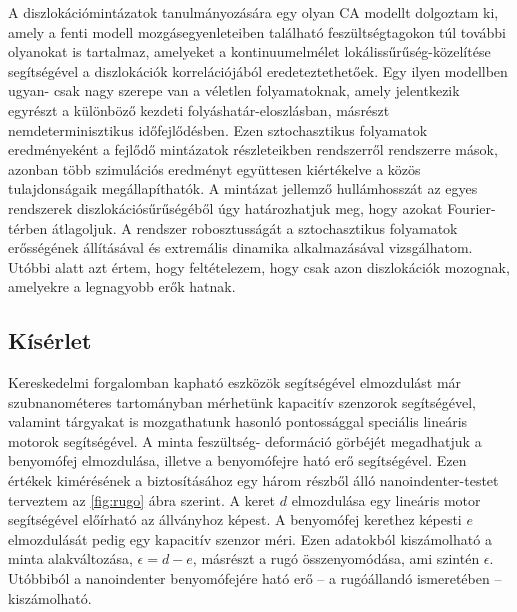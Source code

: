 \documentclass[a5paper,twoside,10pt]{article}
\begin{document}
A diszlokációmintázatok tanulmányozására egy olyan CA modellt dolgoztam ki, amely a fenti modell mozgásegyenleteiben található feszültségtagokon túl további olyanokat is tartalmaz, amelyeket a kontinuumelmélet lokálissűrűség-közelítése segítségével a diszlokációk korrelációjából eredeteztethetőek. Egy ilyen modellben ugyan- csak nagy szerepe van a véletlen folyamatoknak, amely jelentkezik egyrészt a különböző kezdeti folyáshatár-eloszlásban, másrészt nemdeterminisztikus időfejlődésben. Ezen sztochasztikus folyamatok eredményeként a fejlődő mintázatok részleteikben rendszerről rendszerre mások, azonban több szimulációs eredményt együttesen kiértékelve a közös tulajdonságaik megállapíthatók. A mintázat jellemző hullámhosszát az egyes rendszerek diszlokációsűrűségéből úgy határozhatjuk meg, hogy azokat Fourier-térben átlagoljuk. A rendszer robosztusságát a sztochasztikus folyamatok erősségének állításával és extremális dinamika alkalmazásával vizsgálhatom. Utóbbi alatt azt értem, hogy feltételezem, hogy csak azon diszlokációk mozognak, amelyekre a legnagyobb erők hatnak.

\subsection*{Kísérlet}
Kereskedelmi forgalomban kapható eszközök segítségével elmozdulást már szubnanométeres tartományban mérhetünk kapacitív szenzorok segítségével, valamint tárgyakat is mozgathatunk hasonló pontossággal speciális lineáris motorok segítségével. A minta feszültség- deformáció görbéjét megadhatjuk a benyomófej elmozdulása, illetve a benyomófejre ható erő segítségével. Ezen értékek kimérésének a biztosításához egy három részből álló nanoindenter-testet terveztem az \ref{fig:rugo} ábra szerint. A keret $d$ elmozdulása egy lineáris motor segítségével előírható az állványhoz képest. A benyomófej kerethez képesti $e$ elmozdulását pedig egy kapacitív szenzor méri. Ezen adatokból kiszámolható a minta alakváltozása, $\epsilon = d - e $, másrészt a rugó összenyomódása, ami szintén $\epsilon$. Utóbbiból a nanoindenter benyomófejére ható erő -- a rugóállandó ismeretében -- kiszámolható.
\end{document}
